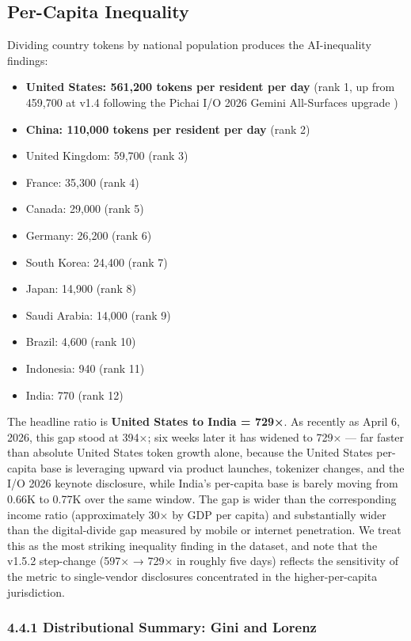 \documentclass[11pt,a4paper]{article}
\begin{document}
\subsection{Per-Capita Inequality}

Dividing country tokens by national population produces the AI-inequality findings:

\begin{itemize}
  \item \textbf{United States: 561,200 tokens per resident per day} (rank 1, up from 459,700 at v1.4 following the Pichai I/O 2026 Gemini All-Surfaces upgrade \cite{pichai2026io})
  \item \textbf{China: 110,000 tokens per resident per day} (rank 2)
  \item United Kingdom: 59,700 (rank 3)
  \item France: 35,300 (rank 4)
  \item Canada: 29,000 (rank 5)
  \item Germany: 26,200 (rank 6)
  \item South Korea: 24,400 (rank 7)
  \item Japan: 14,900 (rank 8)
  \item Saudi Arabia: 14,000 (rank 9)
  \item Brazil: 4,600 (rank 10)
  \item Indonesia: 940 (rank 11)
  \item India: 770 (rank 12)
\end{itemize}

The headline ratio is \textbf{United States to India = 729×}. As recently as April 6, 2026, this gap stood at 394×; six weeks later it has widened to 729× --- far faster than absolute United States token growth alone, because the United States per-capita base is leveraging upward via product launches, tokenizer changes, and the I/O 2026 keynote disclosure, while India's per-capita base is barely moving from 0.66K to 0.77K over the same window. The gap is wider than the corresponding income ratio (approximately 30× by GDP per capita) and substantially wider than the digital-divide gap measured by mobile or internet penetration. We treat this as the most striking inequality finding in the dataset, and note that the v1.5.2 step-change (597× → 729× in roughly five days) reflects the sensitivity of the metric to single-vendor disclosures concentrated in the higher-per-capita jurisdiction.

\subsubsection{4.4.1 Distributional Summary: Gini and Lorenz}
\end{document}
